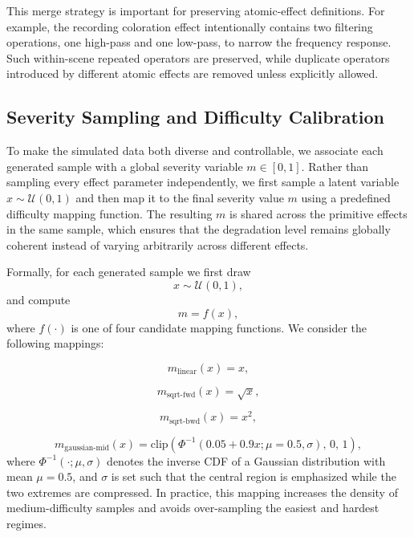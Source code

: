 \documentclass{article}
\begin{document}
This merge strategy is important for preserving atomic-effect definitions. For
example, the recording coloration effect intentionally contains two
filtering operations, one high-pass and one low-pass, to narrow the frequency
response. Such within-scene repeated operators are preserved, while duplicate
operators introduced by different atomic effects are removed unless explicitly
allowed.

\subsection{Severity Sampling and Difficulty Calibration}

To make the simulated data both diverse and controllable, we associate each
generated sample with a global severity variable $m \in [0,1]$. Rather than
sampling every effect parameter independently, we first sample a latent variable
$x \sim \mathcal{U}(0,1)$ and then map it to the final severity value $m$ using
a predefined difficulty mapping function. The resulting $m$ is shared across the
primitive effects in the same sample, which ensures that the degradation level
remains globally coherent instead of varying arbitrarily across different
effects.

Formally, for each generated sample we first draw
\[
x \sim \mathcal{U}(0,1),
\]
and compute
\[
m = f(x),
\]
where $f(\cdot)$ is one of four candidate mapping functions. We consider the
following mappings:

\begin{equation}
m_{\text{linear}}(x) = x,
\end{equation}

\begin{equation}
m_{\text{sqrt-fwd}}(x) = \sqrt{x},
\end{equation}

\begin{equation}
m_{\text{sqrt-bwd}}(x) = x^2,
\end{equation}

\begin{equation}
m_{\text{gaussian-mid}}(x)
=
\mathrm{clip}\!\left(
\Phi^{-1}(0.05 + 0.9x; \mu=0.5,\sigma),
\,0,\,1
\right),
\end{equation}
where $\Phi^{-1}(\cdot;\mu,\sigma)$ denotes the inverse CDF of a Gaussian
distribution with mean $\mu=0.5$, and $\sigma$ is set such that the central
region is emphasized while the two extremes are compressed. In practice, this
mapping increases the density of medium-difficulty samples and avoids
over-sampling the easiest and hardest regimes.
\end{document}
